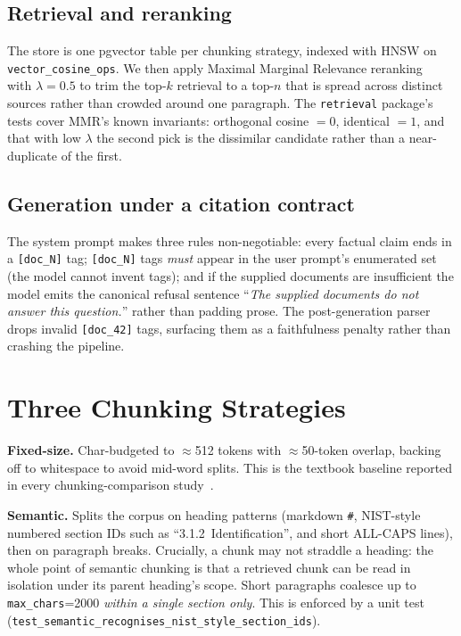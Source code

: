 \documentclass[conference]{IEEEtran}
\begin{document}
\subsection{Retrieval and reranking}
The store is one pgvector table per chunking strategy, indexed with
HNSW on \texttt{vector\_cosine\_ops}. We then apply Maximal Marginal
Relevance reranking~\cite{carbonell1998mmr} with $\lambda=0.5$ to
trim the top-$k$ retrieval to a top-$n$ that is spread across
distinct sources rather than crowded around one paragraph.
The \texttt{retrieval} package's tests cover MMR's known invariants:
orthogonal cosine $=0$, identical $=1$, and that with low $\lambda$
the second pick is the dissimilar candidate rather than a
near-duplicate of the first.

\subsection{Generation under a citation contract}
The system prompt makes three rules non-negotiable: every factual
claim ends in a \texttt{[doc\_N]} tag; \texttt{[doc\_N]} tags
\emph{must} appear in the user prompt's enumerated set (the model
cannot invent tags); and if the supplied documents are insufficient
the model emits the canonical refusal sentence ``\textit{The supplied
documents do not answer this question.}'' rather than padding
prose. The post-generation parser drops invalid \texttt{[doc\_42]}
tags, surfacing them as a faithfulness penalty rather than crashing
the pipeline.

\section{Three Chunking Strategies}
\label{sec:chunk-strategies}

\textbf{Fixed-size.} Char-budgeted to $\approx$512 tokens with
$\approx$50-token overlap, backing off to whitespace to avoid
mid-word splits. This is the textbook baseline reported in every
chunking-comparison study~\cite{iris2025chunking}.

\textbf{Semantic.} Splits the corpus on heading patterns (markdown
\texttt{\#}, NIST-style numbered section IDs such as
``3.1.2~Identification'', and short ALL-CAPS lines), then on paragraph
breaks. Crucially, a chunk may not straddle a heading: the whole
point of semantic chunking is that a retrieved chunk can be read in
isolation under its parent heading's scope. Short paragraphs
coalesce up to \texttt{max\_chars}=2000 \emph{within a single
section only}. This is enforced by a unit test
(\texttt{test\_semantic\_recognises\_nist\_style\_section\_ids}).
\end{document}
